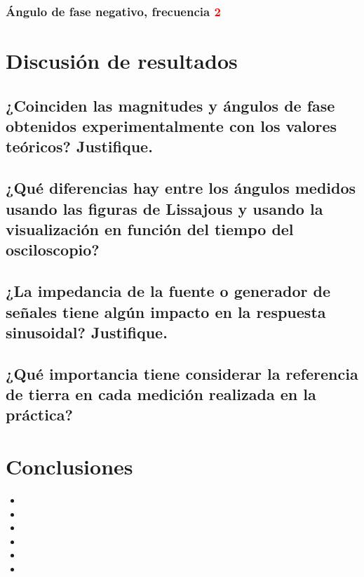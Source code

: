 \documentclass[twocolumn,11pts]{IEEEtran}
\begin{document}
\subsubsection{Ángulo de fase negativo, frecuencia \textcolor{red}{2}}
 
\section{Discusión de resultados}
\subsection{¿Coinciden las magnitudes y ángulos de fase obtenidos experimentalmente con los valores teóricos? Justifique.}

\subsection{¿Qué diferencias hay entre los ángulos medidos usando las figuras de Lissajous y usando la visualización en función del tiempo del osciloscopio?}

\subsection{¿La impedancia de la fuente o generador de señales tiene algún impacto en la respuesta sinusoidal? Justifique.}

\subsection{¿Qué importancia tiene considerar la referencia de tierra en cada medición realizada en la práctica?}

\section{Conclusiones}
\begin{itemize}

\item 
\item 
\item 
\item 
\item 
\item 
\end{itemize}

\end{document}
